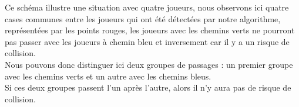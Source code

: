 \documentclass{article}
\begin{document}
	Ce schéma illustre une situation avec quatre joueurs, nous observons ici quatre cases communes entre les joueurs qui ont été détectées par notre algorithme, représentées par les points rouges, les joueurs avec les chemins verts ne pourront pas passer avec les joueurs à chemin bleu et inversement car il y a un risque de collision.\\
	Nous pouvons donc distinguer ici deux groupes de passages : un premier groupe avec les chemins verts et un autre avec les chemins bleus.\\
	Si ces deux groupes passent l'un après l'autre, alors il n'y aura pas de risque de collision.\\
\end{document}
